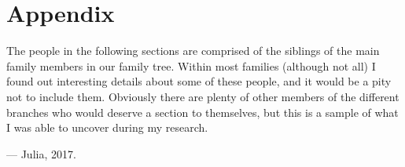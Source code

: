 \documentclass[a4paper]{book}
\begin{document}






























\chapter{Appendix}

The people in the following sections are comprised of the siblings of the main family members in our family tree.
Within most families (although not all) I found out interesting details about some of these people, and it would be a pity not to include them.
Obviously there are plenty of other members of the different branches who would deserve a section to themselves,
but this is a sample of what I was able to uncover during my research.

\hfill --- Julia, 2017.












\printindex
\end{document}
